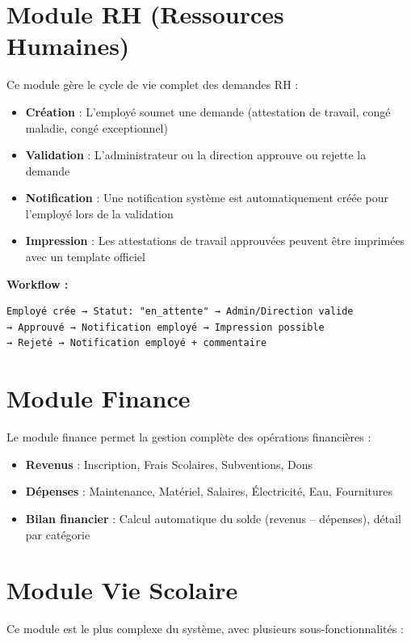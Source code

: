 \documentclass[12pt,a4paper]{report}
\begin{document}
\section{Module RH (Ressources Humaines)}

Ce module gère le cycle de vie complet des demandes RH :

\begin{itemize}
    \item \textbf{Création} : L'employé soumet une demande (attestation de travail, congé maladie, congé exceptionnel)
    \item \textbf{Validation} : L'administrateur ou la direction approuve ou rejette la demande
    \item \textbf{Notification} : Une notification système est automatiquement créée pour l'employé lors de la validation
    \item \textbf{Impression} : Les attestations de travail approuvées peuvent être imprimées avec un template officiel
\end{itemize}

\textbf{Workflow :}
\begin{verbatim}
Employé crée → Statut: "en_attente" → Admin/Direction valide
→ Approuvé → Notification employé → Impression possible
→ Rejeté → Notification employé + commentaire
\end{verbatim}

\section{Module Finance}

Le module finance permet la gestion complète des opérations financières :

\begin{itemize}
    \item \textbf{Revenus} : Inscription, Frais Scolaires, Subventions, Dons
    \item \textbf{Dépenses} : Maintenance, Matériel, Salaires, Électricité, Eau, Fournitures
    \item \textbf{Bilan financier} : Calcul automatique du solde (revenus -- dépenses), détail par catégorie
\end{itemize}

\section{Module Vie Scolaire}

Ce module est le plus complexe du système, avec plusieurs sous-fonctionnalités :
\end{document}

